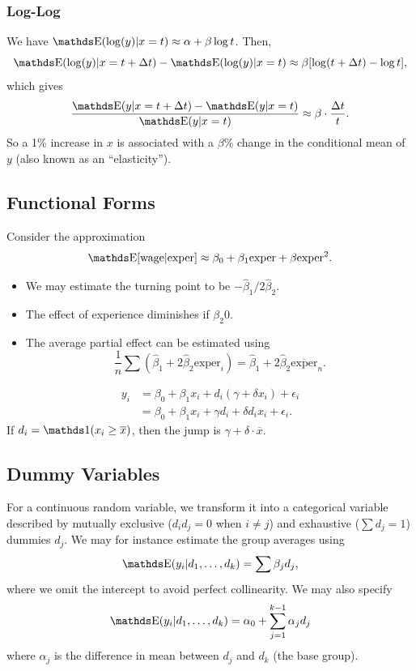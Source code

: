 \documentclass[letterpaper, 10pt]{article}
\begin{document}
\subsubsection{Log-Log}
We have \(\E(\log(y) | x = t) \approx \alpha + \beta \log t\).
Then,
\[
  \E(\log(y) | x = t + \Delta t) - \E(\log(y) | x = t)
  \approx \beta [\log (t + \Delta t) - \log t],
\]
which gives
\[
  \frac{\E(y|x = t + \Delta t) - \E(y|x = t)}{\E(y|x = t)}
  \approx \beta \cdot \frac{\Delta t}{t}.
\]
So a 1\% increase in \(x\) is associated with a \(\beta\)\% change in the conditional mean of \(y\) (also known as an ``elasticity'').


\subsection{Functional Forms}
\begin{example}[Polynomials]
  Consider the approximation
  \[
    \E[\mathrm{wage}| \mathrm{exper}]
    \approx \beta_0 + \beta_1 \mathrm{exper} + \beta \mathrm{exper}^2.
  \]
  \begin{itemize}
    \item We may estimate the turning point to be \(- \hat{\beta}_1 / 2 \hat{\beta}_2\).
    \item The effect of experience diminishes if \(\beta_2  0\).
    \item The average partial effect can be estimated using
      \[
        \frac{1}{n} \sum (\hat{\beta}_1 + 2 \hat{\beta}_2 \mathrm{exper}_i)
        = \hat{\beta}_1 + 2 \hat{\beta}_2 \overline{\mathrm{exper}}_n.
      \]
  \end{itemize}
\end{example}

\begin{example}
  \begin{align*}
    y_i
    &= \beta_0 + \beta_1 x_i + d_i(\gamma + \delta x_i) + \epsilon_i \\
    &= \beta_0 + \beta_1 x_i + \gamma d_i + \delta d_i x_i + \epsilon_i.
  \end{align*}
  If \(d_i = \ind(x_i \geq \overline{x})\), then the jump is \(\gamma + \delta \cdot \overline{x}\).
\end{example}

\subsection{Dummy Variables}
\begin{example}
  For a continuous random variable, we transform it into a categorical variable described by mutually exclusive (\(d_i d_j = 0\) when \(i \neq j\)) and exhaustive (\(\sum d_j = 1\)) dummies \(d_j\).
  We may for instance estimate the group averages using
  \[
    \E(y_i| d_1, \dots, d_k) 
    = \sum \beta_j d_j,
  \]
  where we omit the intercept to avoid perfect collinearity.
  We may also specify
  \[
    \E(y_i| d_1, \dots, d_k) 
    = \alpha_0 + \sum_{j = 1}^{k - 1} \alpha_j d_j
  \]
  where \(\alpha_j\) is the difference in mean between \(d_j\) and \(d_k\) (the base group).
\end{example}
\end{document}
